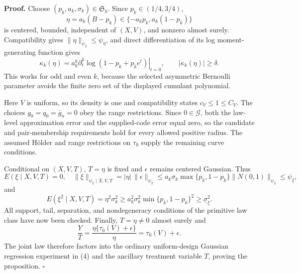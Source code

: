 \textbf{Proof.}
Choose \((p_k,a_k,\sigma_k)\in\mathfrak S_k\).  Since \(p_k\in(1/4,3/4)\),
\[
 \eta=a_k(B-p_k)\in\{-a_kp_k,a_k(1-p_k)\}
\]
is centered, bounded, independent of \((X,V)\), and nonzero almost surely.  Compatibility gives \(\|\eta\|_{\psi_2}\le\psi_\eta\), and direct differentiation of its log moment-generating function gives
\[
 \kappa_k(\eta)=a_k^k\left.\partial_t^k\log(1-p_k+p_ke^t)\right|_{t=0},
 \qquad |\kappa_k(\eta)|\ge\delta. \tag{1}
\]
This works for odd and even \(k\), because the selected asymmetric Bernoulli parameter avoids the finite zero set of the displayed cumulant polynomial.

Here \(V\) is uniform, so its density is one and compatibility states \(c_V\le1\le C_V\).  The choices \(g_0=q_0=\bar g_n=0\) obey the range restrictions.  Since \(0\in\mathcal G\), both the law-level approximation error and the supplied-code error equal zero, so the candidate and pair-membership requirements hold for every allowed positive radius.  The assumed H\"older and range restrictions on \(\tau_0\) supply the remaining curve conditions.

Conditional on \((X,V,T)\), \(T=\eta\) is fixed and \(\epsilon\) remains centered Gaussian.  Thus
\[
 E(\xi\mid X,V,T)=0,
 \quad
 \|\xi\|_{\psi_2\mid X,V,T}
 =|\eta|\,\|\epsilon\|_{\psi_2}
 \le a_k\sigma_k\max\{p_k,1-p_k\}\|N(0,1)\|_{\psi_2}
 \le\psi_\xi, \tag{2}
\]
and
\[
 E(\xi^2\mid X,V,T)=\eta^2\sigma_k^2
 \ge a_k^2\sigma_k^2\min\{p_k,1-p_k\}^2
 \ge\underline\sigma_\xi^2. \tag{3}
\]
All support, tail, separation, and nondegeneracy conditions of the primitive law class have now been checked.  Finally, \(T=\eta\ne0\) almost surely and
\[
 \frac{Y}{T}=\frac{\eta\{\tau_0(V)+\epsilon\}}{\eta}
 =\tau_0(V)+\epsilon. \tag{4}
\]
The joint law therefore factors into the ordinary uniform-design Gaussian regression experiment in (4) and the ancillary treatment variable \(T\), proving the proposition. \(\square\)